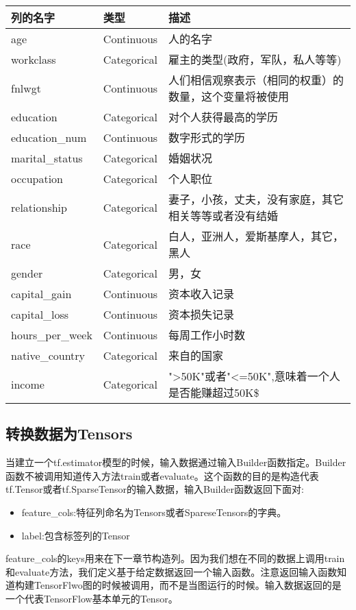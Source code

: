 \begin{table}[H]
\centering
\begin{tabular}{ |p{4cm}||p{2cm}|p{6cm}|}
\hline
列的名字&类型&描述\\
\hline
age&Continuous&人的名字\\
\hline
workclass&  Categorical&雇主的类型(政府，军队，私人等等)\\
\hline
fnlwgt& Continuous& 人们相信观察表示（相同的权重）的数量，这个变量将被使用\\
\hline
education&  Categorical&对个人获得最高的学历\\
\hline
education\_num& Continuous& 数字形式的学历\\
\hline
marital\_status&  Categorical&婚姻状况\\
\hline
occupation& Categorical&个人职位\\
\hline
relationship& Categorical &妻子，小孩，丈夫，没有家庭，其它相关等等或者没有结婚\\
\hline
race& Categorical&白人，亚洲人，爱斯基摩人，其它，黑人\\
\hline
gender& Categorical&男，女\\
\hline
capital\_gain&  Continuous& 资本收入记录\\
\hline
capital\_loss&  Continuous& 资本损失记录\\
\hline
hours\_per\_week& Continuous& 每周工作小时数\\
\hline
native\_country&  Categorical&  来自的国家\\
\hline
income& Categorical&">50K"或者"<=50K",意味着一个人是否能赚超过50K\$\\
\hline
\end{tabular}
\end{table}
\subsection{转换数据为Tensors}
当建立一个tf.estimator模型的时候，输入数据通过输入Builder函数指定。Builder函数不被调用知道传入方法train或者evaluate。这个函数的目的是构造代表tf.Tensor或者tf.SparseTensor的输入数据，输入Builder函数返回下面对:
\begin{itemize}
  \item feature\_cols:特征列命名为Tensors或者SpareseTensors的字典。
  \item label:包含标签列的Tensor
\end{itemize}
feature\_cols的keys用来在下一章节构造列。因为我们想在不同的数据上调用train和evaluate方法，我们定义基于给定数据返回一个输入函数。注意返回输入函数知道构建TensorFlwo图的时候被调用，而不是当图运行的时候。输入数据返回的是一个代表TensorFlow基本单元的Tensor。

